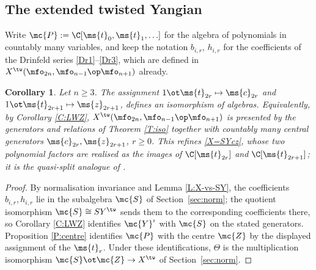 \documentclass{amsart}
\newtheorem{crl}[theorem]{Corollary}
\numberwithin{equation}{section}
\theoremstyle{remark}
\renewcommand{\,}{\kern 0.1em} %
\begin{document}

\subsection{The extended twisted Yangian} \label{sec:ext}

Write $\mc{P} := \C[\ms{t}_0,\ms{t}_1,\ldots]$ for
the algebra of polynomials in countably many variables, and keep the notation $b_{i,r}$,
$h_{i,r}$ for the coefficients of the Drinfeld series \eqref{Dr1}--\eqref{Dr3}, which are
defined in $X^\tw(\mfo_{2n},\mfo_{n-1}\op\mfo_{n+1})$ already.

\begin{crl} \label{C:iso-ext}
%
Let $n\ge3$. The assignment
%
%
$1\ot\ms{t}_{2r}\mapsto\ms{c}_{2r}$ and $1\ot\ms{t}_{2r+1}\mapsto\ms{z}_{2r+1}$, defines an
isomorphism of algebras. Equivalently, by Corollary \ref{C:LWZ},
$X^\tw(\mfo_{2n},\mfo_{n-1}\op\mfo_{n+1})$ is presented by the generators and relations of
Theorem \ref{T:iso} together with countably many central generators
$\ms{c}_{2r},\ms{z}_{2r+1}$, $r\ge0$. This refines \eqref{X=SYcz}, whose two polynomial factors
are realised as the images of $\C[\ms{t}_{2r}]$ and $\C[\ms{t}_{2r+1}]$; it is the quasi-split
analogue of \cite[Rem.~5.18]{Re26}.
%
\end{crl}

\begin{proof}
%
By normalisation invariance and Lemma \ref{L:X-vs-SY}, the coefficients $b_{i,r},h_{i,r}$
lie in the subalgebra $\mc{S}$ of Section~\ref{sec:norm}; the quotient isomorphism
$\mc{S}\cong SY^\tw$ sends them to the corresponding coefficients there, so Corollary
\ref{C:LWZ} identifies $\mc{Y}^\imath$ with $\mc{S}$ on the stated generators.
Proposition \ref{P:centre} identifies $\mc{P}$ with the centre $\mc{Z}$ by the displayed
assignment of the $\ms{t}_r$.
Under these identifications, $\Theta$ is the multiplication isomorphism
$\mc{S}\ot\mc{Z}\to X^\tw$ of Section~\ref{sec:norm}.
%
\end{proof}
\end{document}
